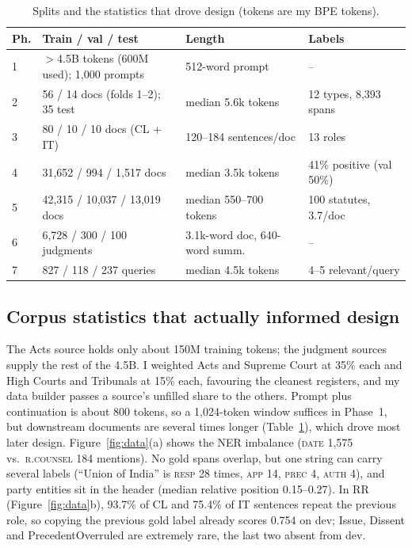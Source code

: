 \documentclass[11pt, oneside]{article}
\begin{document}
\begin{table}[t]
\centering\small
\caption{Splits and the statistics that drove design (tokens are my BPE tokens).}
\label{tab:data}
\setlength{\tabcolsep}{3.5pt}
\begin{tabular}{@{}llll@{}}
\toprule
Ph. & Train / val / test & Length & Labels \\
\midrule
1 & $>$4.5B tokens (600M used); 1{,}000 prompts & 512-word prompt & -- \\
2 & 56 / 14 docs (folds 1--2); 35 test & median 5.6k tokens & 12 types, 8{,}393 spans \\
3 & 80 / 10 / 10 docs (CL + IT) & 120--184 sentences/doc & 13 roles \\
4 & 31{,}652 / 994 / 1{,}517 docs & median 3.5k tokens & 41\% positive (val 50\%) \\
5 & 42{,}315 / 10{,}037 / 13{,}019 docs & median 550--700 tokens & 100 statutes, 3.7/doc \\
6 & 6{,}728 / 300 / 100 judgments & 3.1k-word doc, 640-word summ. & -- \\
7 & 827 / 118 / 237 queries & median 4.5k tokens & 4--5 relevant/query \\
\bottomrule
\end{tabular}
\end{table}

\subsection{Corpus statistics that actually informed design}
The Acts source holds only about 150M training tokens; the judgment sources supply the rest of the 4.5B. I weighted
Acts and Supreme Court at 35\% each and High Courts and Tribunals at 15\% each, favouring the cleanest registers, and
my data builder passes a source's unfilled share to the others. Prompt plus continuation is about 800 tokens, so a
1{,}024-token window suffices in Phase~1, but downstream documents are several times longer
(Table~\ref{tab:data}), which drove most later design. Figure~\ref{fig:data}(a) shows the NER imbalance
(\textsc{date} 1{,}575 vs.\ \textsc{r.counsel} 184 mentions). No gold spans overlap, but one string can carry several
labels (``Union of India'' is \textsc{resp} 28 times, \textsc{app} 14, \textsc{prec} 4, \textsc{auth} 4), and party
entities sit in the header (median relative position 0.15--0.27). In RR (Figure~\ref{fig:data}b), 93.7\% of CL and
75.4\% of IT sentences repeat the previous role, so copying the previous gold label already scores 0.754 on dev;
Issue, Dissent and PrecedentOverruled are extremely rare, the last two absent from dev.
\end{document}
